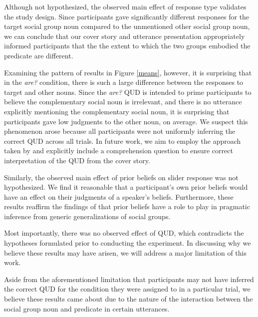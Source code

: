 \documentclass[11pt,a4paper]{article}
\begin{document}
Although not hypothesized, the observed main effect of response type validates the study design. Since participants gave significantly different responses for the target social group noun compared to the unmentioned other social group noun, we can conclude that our cover story and utterance presentation appropriately informed participants that the the extent to which the two groups embodied the predicate are different. 

Examining the pattern of results in Figure \ref{means}, however, it is surprising that in the \textit{are?} condition, there is such a large difference between the responses to target and other nouns. Since the \textit{are?} QUD is intended to prime participants to believe the complementary social noun is irrelevant, and there is no utterance explicitly mentioning the complementary social noun, it is surprising that participants gave low judgments to the other noun, on average. We suspect this phenomenon arose because all participants were not uniformly inferring the correct QUD across all trials. In future work, we aim to employ the approach taken by \citet{degen-goodman-2014} and explicitly include a comprehension question to ensure correct interpretation of the QUD from the cover story. 

Similarly, the observed main effect of prior beliefs on slider response was not hypothesized. We find it reasonable that a participant's own prior beliefs would have an effect on their judgments of a speaker's beliefs. Furthermore, these results reaffirm the findings of \citet{degen2017} that prior beliefs have a role to play in pragmatic inference from generic generalizations of social groups. 

Most importantly, there was no observed effect of QUD, which contradicts the hypotheses formulated prior to conducting the experiment. In discussing why we believe these results may have arisen, we will address a major limitation of this work.

Aside from the aforementioned limitation that participants may not have inferred the correct QUD for the condition they were assigned to in a particular trial, we believe these results came about due to the nature of the interaction between the social group noun and predicate in certain utterances. 
\end{document}
